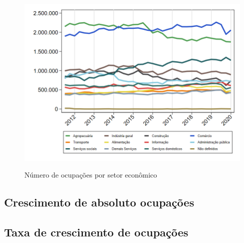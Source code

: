 \documentclass[10pt]{beamer}
\begin{document}
\begin{frame}
\textit{\hyperlink{indice_principal_amz}{}}
\begin{figure}
  \centering
  \includegraphics[width=.85\linewidth]{./../analysis/output/_importancia_relativa.png}
  \label{_importancia_relativa}
  \caption{{Número de ocupações por setor econômico}}
\end{figure}
\end{frame}

\subsection{Crescimento de absoluto ocupações}

\begin{frame}
\textit{\hyperlink{indice_principal_amz}{}}

\end{frame}

\begin{frame}
\textit{\hyperlink{indice_principal_amz}{}}

\end{frame}

\begin{frame}
\textit{\hyperlink{indice_principal_amz}{}}

\end{frame}

\subsection{Taxa de crescimento de ocupações}

\begin{frame}
\textit{\hyperlink{indice_principal_amz}{}}

\end{frame}
\end{document}
